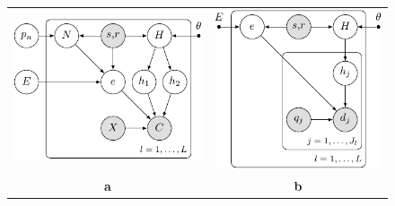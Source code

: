 \documentclass{article}
\begin{document}
\begin{figure}
\label{fig:PGM}
\begin{tabular}{cc}
    \includegraphics{figures/indelErrorPGMFigureA.pdf}
&
    \includegraphics{figures/indelErrorPGMFigureB.pdf} \\
{\bf a} & {\bf b} \\
\end{tabular}

\end{figure}
\end{document}
